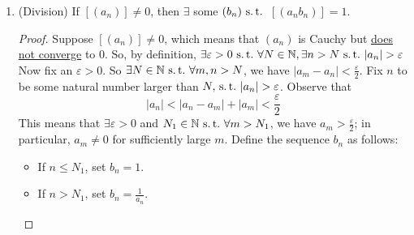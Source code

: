 \documentclass[12pt]{amsart}
\newcommand{\bbN}{\mathbb{N}}
\newcommand{\suchthat}{\operatorname{\thinspace s.t. \thinspace}}
\theoremstyle{plain}
\theoremstyle{remark}
\theoremstyle{definition}
\begin{document}
\begin{enumerate}[(1)]
\begin{proof}
			Let $M$ be a positive upper bound for both $b_n$ and $c_n$. Then $\forall \varepsilon > 0$, . 
			\begin{itemize}[-]
				\item $\exists N_1 \suchthat$ if $n > N_1$, then
					\begin{equation*}
						|a_n - c_n| < \frac{\varepsilon}{2M}
					\end{equation*}
				\item $\exists N_2 \suchthat$ if $n > N_2$, then 
					\begin{equation*}
						|b_n - d_n| < \frac{\varepsilon}{2M}
					\end{equation*}
			\end{itemize}
			So if $N = \max\Set{N_1, N_2}$ and $n > N$, then 
			\begin{equation*}
				|a_n b_n - c_n d_n| < M\cdot \frac{\varepsilon}{2M} + M \cdot \frac{\varepsilon}{2M} = \varepsilon
			\end{equation*}
			So $|a_n - b_n| \rightarrow 0$, indicating $(a_n b_n) \sim (c_n d_n)$.
			\newline
			So multiplication is well-defined.
		\end{proof}
			Further, multiplication distributes  over addition; and $[(a_n)] \cdot 1 = [(a_n)]$.
		\item (Division)
			If $[(a_n)] \neq 0$, then $\exists$ some $(b_n) \suchthat$ $[(a_n b_n)] = 1$.
			\begin{proof}
				Suppose $[(a_n)] \neq 0$, which means that $(a_n)$ is Cauchy but \ul{does not converge} to $0$. So, by definition, $\exists \varepsilon > 0 \suchthat \forall N \in \bbN, \exists n > N \suchthat |a_n| > \varepsilon$
				Now fix an $\varepsilon > 0$. So $\exists N \in \bbN \suchthat \forall m,n > N$, we have $|a_m - a_n| < \frac{\varepsilon}{2}$.
				\newline
				Fix $n$ to be some natural number larger than $N, \suchthat |a_n| > \varepsilon$. Observe that 
				\begin{equation*}
					|a_n| < |a_n - a_m| + |a_m| < \frac{\varepsilon}{2}
				\end{equation*}
				This means that $\exists \varepsilon > 0$ and $N_1 \in \bbN \suchthat \forall m > N_1$, we have $a_m > \frac{\varepsilon}{2}$; in particular, $a_m \neq 0$ for sufficiently large $m$.
				\newline
				Define the sequence $b_n$ as follows:
				\begin{itemize}[-]
					\item 
						If $n \leqslant N_1$, set $b_n = 1$.
					\item
						If $n > N_1$, set $b_n = \frac{1}{a_n}$.
				\end{itemize}


\end{proof}
\end{enumerate}
\end{document}
